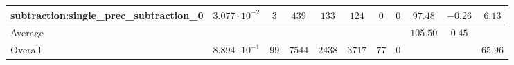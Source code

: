 \begin{tabular}{|l|c|c|c|c|c|c|c|c|c|c|}
subtraction:single\_prec\_subtraction\_0         & $ 3.077 \cdot 10^{-2} $ & $ 3      $ & $ 439  $ & $ 133  $ & $ 124   $ & $ 0  $ & $ 0 $ & $ 97.48       $ & $ -0.26   $ & $ 6.13    $ \\
\hline
Average                                          & $                     $ & $        $ & $      $ & $      $ & $       $ & $    $ & $   $ & $ 105.50      $ & $ 0.45    $ & $         $ \\
\hline
Overall                                          & $ 8.894 \cdot 10^{-1} $ & $ 99     $ & $ 7544 $ & $ 2438 $ & $ 3717  $ & $ 77 $ & $ 0 $ & $             $ & $         $ & $ 65.96   $ \\
\hline
\end{tabular}

